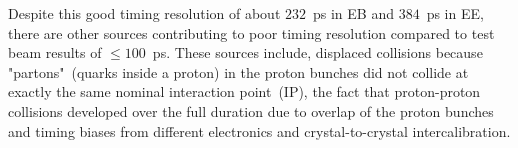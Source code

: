 Despite this good timing resolution of about $232$~ps in EB and $384$~ps in EE, there are other sources contributing to poor timing resolution compared to test beam results of $\leq 100$~ps. These sources include,
displaced collisions because "partons"~(quarks inside a proton) in the proton bunches did not collide at exactly the same nominal interaction point~(IP), the fact that proton-proton collisions developed over the full duration due to overlap of the proton bunches and timing biases from different electronics and crystal-to-crystal intercalibration.


 
